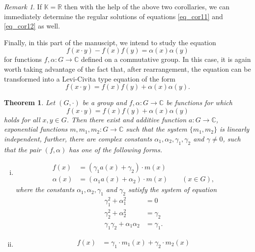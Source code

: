 \documentclass[a4paper,12pt]{article}
\theoremstyle{plain}
\newtheorem{thm}{Theorem}
\theoremstyle{definition}
\theoremstyle{remark}
\newtheorem*{rem}{Remark}
\begin{document}
\begin{rem}
 If $\mathbb{K}= \mathbb{R}$ then with the help of the above two corollaries, we can immediately determine the regular solutions of equations \eqref{eq_cor11} and \eqref{eq_cor12} as well. 
\end{rem}



Finally, in this part of the manuscipt, we intend to study the equation
\[
 f(x\cdot y)-f(x)f(y)= \alpha(x)\alpha(y)  
\]
for functions $f, \alpha\colon G\to \mathbb{C}$ defined on a commutative group. In this case, it is again worth taking advantage of the fact that, after rearrangement, the equation can be transformed into a Levi-Civita type equation of the form 
\[
 f(x\cdot y)= f(x)f(y)+\alpha(x)\alpha(y). 
\]


\begin{thm}\label{thm_exp_difference_prod}
 Let $(G, \cdot)$ be a group and $f, \alpha \colon G\to \mathbb{C}$ be functions for which 
 \begin{equation}\label{exp_difference_prod}
  f(x\cdot y)= f(x)f(y)+\alpha(x)\alpha(y) 
 \end{equation}
 holds for all $x, y\in G$. Then there exist and additive function $a\colon G\to \mathbb{C}$, exponential functions $m, m_{1}, m_{2}\colon G\to \mathbb{C}$ such that the system $\{ m_{1}, m_{2} \}$ is linearly independent, further, there are complex constants $\alpha_{1}, \alpha_{2}, \gamma_{1}, \gamma_{2}$ and $\gamma\neq 0$, such that the pair $(f, \alpha)$ has one of the following forms. 
 \begin{enumerate}[(i)]
  \item 
  \begin{align*}
   f(x)&= (\gamma_{1} a(x)+\gamma_{2})\cdot m(x)\\
   \alpha(x)&= (\alpha_{1} a(x)+\alpha_{2})\cdot m(x)
   \qquad (x\in G), 
  \end{align*}
where the constants $\alpha_{1}, \alpha_2, \gamma_{1}$ and $\gamma_{2}$ satisfy the system of equation
\begin{align*}
 \gamma_{1}^{2}+\alpha_{1}^2&=0\\
 \gamma_{2}^{2}+\alpha_{2}^2&=\gamma_{2}\\
 \gamma_{1}\gamma_{2}+\alpha_{1}\alpha_{2}&= \gamma_{1}. 
\end{align*}
\item \begin{align*}
   f(x)&= \gamma_{1}\cdot m_{1}(x)+\gamma_{2}\cdot m_{2}(x)\\

\end{align*}
\end{enumerate}
\end{thm}
\end{document}
